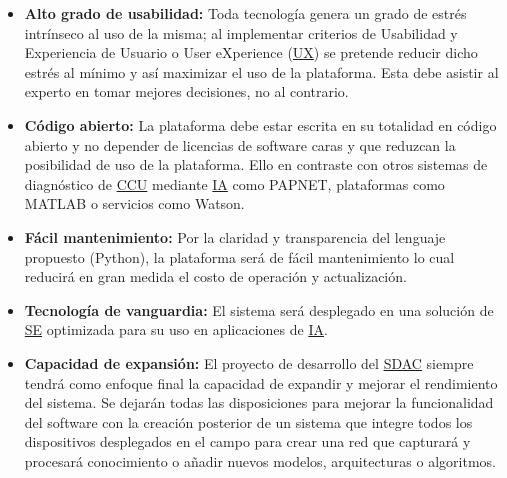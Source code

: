 \begin{minipage}{\textwidth}
\begin{itemize}
    \item{\textbf{Alto grado de usabilidad:}} Toda tecnología genera un grado de
    estrés intrínseco al uso de la misma; al implementar criterios de Usabilidad
    y Experiencia de Usuario o User eXperience
    (\hyperlink{abbr}{UX}) se pretende reducir
    dicho estrés al mínimo y así maximizar el uso de la plataforma. Esta debe
    asistir al experto en tomar mejores decisiones, no al
    contrario.~\cite{Nielsen1993}
    \item{\textbf{Código abierto:}}  La plataforma debe estar escrita en su
    totalidad en código abierto y no depender de licencias de software caras y
    que reduzcan la posibilidad de uso de la plataforma. Ello en contraste con
    otros sistemas de diagnóstico de \hyperlink{abbr}{CCU} mediante
    \hyperlink{abbr}{IA} como PAPNET, plataformas como MATLAB o servicios como
    Watson.~\cite{Zhou}
    \item{\textbf{Fácil mantenimiento:}}  Por la claridad y transparencia del
    lenguaje propuesto (Python), la plataforma será de fácil mantenimiento lo
    cual reducirá en gran medida el costo de operación y
    actualización.~\cite{Pedrycz2017}
    \item{\textbf{Tecnología de vanguardia:}} El sistema será desplegado en una
    solución de \hyperlink{abbr}{SE} optimizada para su uso en aplicaciones de
    \hyperlink{abbr}{IA}. 
    \item{\textbf{Capacidad de expansión:}} El proyecto de desarrollo del \hyperlink{abbr}{SDAC}
    siempre tendrá como enfoque final la capacidad de expandir y mejorar el
    rendimiento del sistema. Se dejarán todas las disposiciones para mejorar la
    funcionalidad del software con la creación posterior de un sistema que
    integre todos los dispositivos desplegados en el campo para crear una red
    que capturará y procesará conocimiento o añadir nuevos modelos,
    arquitecturas o algoritmos.
\end{itemize}
\end{minipage}